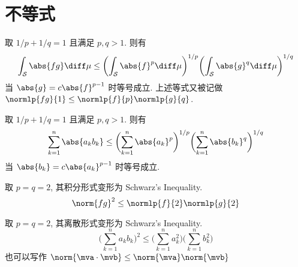 \section{不等式}
\begin{defination}
取 $1/p + 1/q = 1$ 且满足 $p, q > 1$. 则有
\[
\int_\mathcal{S} \abs{f g} \diff \mu
    \leq \biggl( \int_\mathcal{S} \abs{f}^p \diff \mu \biggr)^{1/p}
        \biggl( \int_\mathcal{S} \abs{g}^q \diff \mu \biggr)^{1/q}
\]
当 $\abs{g} = c \abs{f}^{p-1}$ 时等号成立. 上述等式又被记做
$\normlp{fg}{1} \leq \normlp{f}{p} \normlp{g}{q}$.
\end{defination}

\begin{defination}
取 $1/p + 1/q = 1$ 且满足 $p, q > 1$. 则有
\[
\sum_{k=1}^n \abs{a_k b_k}
    \leq \biggl( \sum_{k=1}^n \abs{a_k}^p \biggr)^{1/p}
        \biggl( \sum_{k=1}^n \abs{b_k}^q \biggr)^{1/q}
\]
当 $\abs{b_k} = c \abs{a_k}^{p-1}$ 时等号成立.
\end{defination}

\begin{thm}
取 $p = q = 2$, 其积分形式变形为 Schwarz's Inequality.
\[ \norm{fg}^2 \leq \normlp{f}{2} \normlp{g}{2} \]
\end{thm}

\begin{thm}
取 $p = q = 2$, 其离散形式变形为 Schwarz's Inequality.
\[
\biggl(\sum_{k=1}^n a_k b_k \biggr)^2
    \leq \biggl(\sum_{k=1}^n a_k^2 \biggr) \biggl(\sum_{k=1}^n b_k^2 \biggr)\]
也可以写作 $\norm{\mva\cdot\mvb} \leq \norm{\mva} \norm{\mvb}$
\end{thm}
\endinput
